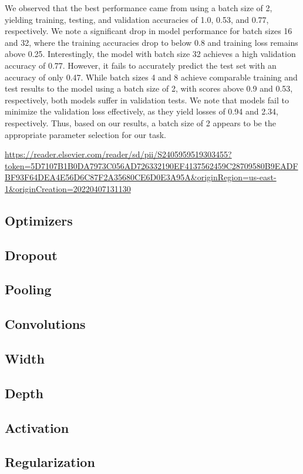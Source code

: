 \documentclass{article}
\begin{document}
We observed that the best performance came from using a batch size of 2, yielding training, testing, and validation accuracies of 1.0, 0.53, and 0.77, respectively. We note a significant drop in model performance for batch sizes 16 and 32, where the training accuracies drop to below 0.8 and training loss remains above 0.25. Interestingly, the model with batch size 32 achieves a high validation accuracy of 0.77. However, it fails to accurately predict the test set with an accuracy of only 0.47. While batch sizes 4 and 8 achieve comparable training and test results to the model using a batch size of 2, with scores above 0.9 and 0.53, respectively, both models suffer in validation tests. We note that models fail to minimize the validation loss effectively, as they yield losses of 0.94 and 2.34, respectively. Thus, based on our results, a batch size of 2 appears to be the appropriate parameter selection for our task.

\url{https://reader.elsevier.com/reader/sd/pii/S2405959519303455?token=5D7107B1B0DA7973C056AD726332190EF4137562459C28709580B9EADFBF93F64DEA4E56D6C87F2A35680CE6D0E3A95A&originRegion=us-east-1&originCreation=20220407131130}

\subsection{Optimizers}
\subsection{Dropout}
\subsection{Pooling}
\subsection{Convolutions}
\subsection{Width}
\subsection{Depth}
\subsection{Activation}
\subsection{Regularization}
\end{document}

